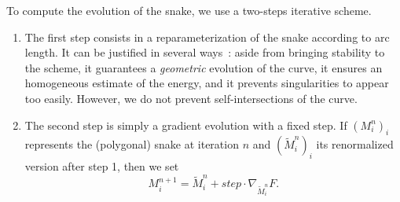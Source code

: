 \medskip

To compute the evolution of the snake, we use a two-steps iterative
scheme.
\begin{enumerate}
\item The first step consists in a reparameterization of the snake
according to arc length. It can be justified in several ways~:
aside from bringing stability to the scheme, it guarantees a {\it
geometric} evolution of the curve, it ensures an homogeneous
estimate of the energy, and it prevents singularities to appear
too easily. However, we do not prevent self-intersections of the
curve.
\item The second step is simply a gradient evolution with a fixed step.
If $(M_i^n)_i$ represents the (polygonal) snake at iteration $n$ and
$(\tilde M_i^n)_i$ its renormalized version after step 1, then we set
$$M_i^{n+1} = \tilde M_i^n + step \cdot  \nabla_{\tilde M_i^n} F.$$
\end{enumerate}

